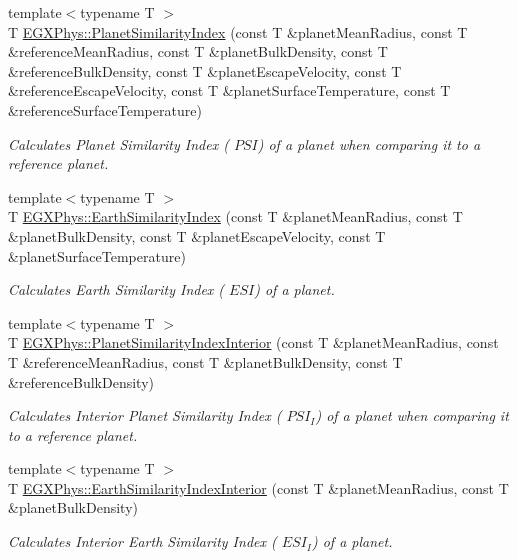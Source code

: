 \begin{DoxyCompactItemize}
{\footnotesize template$<$typename T $>$ }\\T \hyperlink{group___astrophysics_ga62e8b781c301df60bd04af3183a965eb}{E\+G\+X\+Phys\+::\+Planet\+Similarity\+Index} (const T \&planet\+Mean\+Radius, const T \&reference\+Mean\+Radius, const T \&planet\+Bulk\+Density, const T \&reference\+Bulk\+Density, const T \&planet\+Escape\+Velocity, const T \&reference\+Escape\+Velocity, const T \&planet\+Surface\+Temperature, const T \&reference\+Surface\+Temperature)
\begin{DoxyCompactList}\small\item\em Calculates Planet Similarity Index ( $PSI$) of a planet when comparing it to a reference planet. \end{DoxyCompactList}\item 
{\footnotesize template$<$typename T $>$ }\\T \hyperlink{group___astrophysics_ga4b86397b1c839c49ac599d49fda207d4}{E\+G\+X\+Phys\+::\+Earth\+Similarity\+Index} (const T \&planet\+Mean\+Radius, const T \&planet\+Bulk\+Density, const T \&planet\+Escape\+Velocity, const T \&planet\+Surface\+Temperature)
\begin{DoxyCompactList}\small\item\em Calculates Earth Similarity Index ( $ESI$) of a planet. \end{DoxyCompactList}\item 
{\footnotesize template$<$typename T $>$ }\\T \hyperlink{group___astrophysics_ga6dc06a1a8baf6e132abed51fcf410c7f}{E\+G\+X\+Phys\+::\+Planet\+Similarity\+Index\+Interior} (const T \&planet\+Mean\+Radius, const T \&reference\+Mean\+Radius, const T \&planet\+Bulk\+Density, const T \&reference\+Bulk\+Density)
\begin{DoxyCompactList}\small\item\em Calculates Interior Planet Similarity Index ( $PSI_I$) of a planet when comparing it to a reference planet. \end{DoxyCompactList}\item 
{\footnotesize template$<$typename T $>$ }\\T \hyperlink{group___astrophysics_ga699bcc2f17b8855eaa856595d8032f61}{E\+G\+X\+Phys\+::\+Earth\+Similarity\+Index\+Interior} (const T \&planet\+Mean\+Radius, const T \&planet\+Bulk\+Density)
\begin{DoxyCompactList}\small\item\em Calculates Interior Earth Similarity Index ( $ESI_I$) of a planet. \end{DoxyCompactList}\item 

\end{DoxyCompactItemize}

